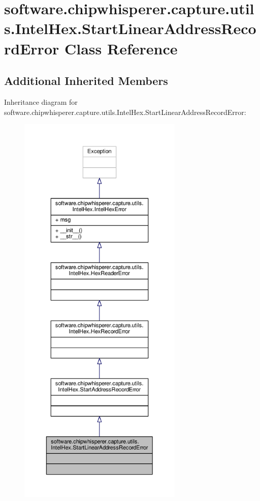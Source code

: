 \hypertarget{classsoftware_1_1chipwhisperer_1_1capture_1_1utils_1_1IntelHex_1_1StartLinearAddressRecordError}{}\section{software.\+chipwhisperer.\+capture.\+utils.\+Intel\+Hex.\+Start\+Linear\+Address\+Record\+Error Class Reference}
\label{classsoftware_1_1chipwhisperer_1_1capture_1_1utils_1_1IntelHex_1_1StartLinearAddressRecordError}
\subsection*{Additional Inherited Members}


Inheritance diagram for software.\+chipwhisperer.\+capture.\+utils.\+Intel\+Hex.\+Start\+Linear\+Address\+Record\+Error\+:\nopagebreak
\begin{figure}[H]
\begin{center}
\leavevmode
\includegraphics[height=550pt]{da/d99/classsoftware_1_1chipwhisperer_1_1capture_1_1utils_1_1IntelHex_1_1StartLinearAddressRecordError__inherit__graph}
\end{center}
\end{figure}


